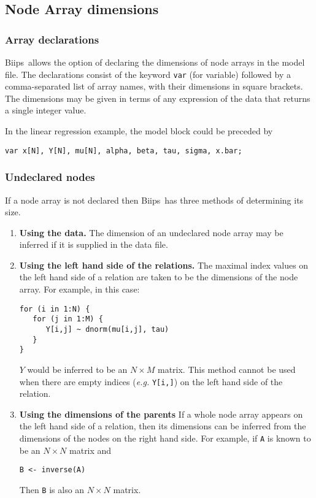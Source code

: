 \documentclass[11pt, a4paper, titlepage]{report}
\newcommand{\biips}{\textsf{Biips}}
\begin{document}
\subsection{Node Array dimensions}

\subsubsection*{Array declarations}

\biips\ allows the option of declaring the dimensions of node arrays in
the model file. The declarations consist of the keyword \texttt{var}
(for variable) followed by a comma-separated list of array names, with
their dimensions in square brackets. The dimensions may be given in
terms of any expression of the data that returns a single integer
value.

In the linear regression example, the model block could be preceded by
\begin{verbatim}
var x[N], Y[N], mu[N], alpha, beta, tau, sigma, x.bar;
\end{verbatim}

\subsubsection*{Undeclared nodes}

If a node array is not declared then \biips\ has three methods of
determining its size.
\begin{enumerate}
\item {\bf Using the data.}  The dimension of an undeclared node array
  may be inferred if it is supplied in the data file.
\item {\bf Using the left hand side of the relations.}  The maximal
  index values on the left hand side of a relation are taken to be the
  dimensions of the node array.  For example, in this case:
\begin{verbatim}
for (i in 1:N) {
   for (j in 1:M) {
      Y[i,j] ~ dnorm(mu[i,j], tau)
   }
}
\end{verbatim}
$Y$ would be inferred to be an $N \times M$ matrix. This method cannot 
be used when there are empty indices ({\em e.g.} \verb+Y[i,]+) on the left
hand side of the relation.
\item {\bf Using the dimensions of the parents} If a whole node array
  appears on the left hand side of a relation, then its dimensions can
  be inferred from the dimensions of the nodes on the right hand side.
  For example, if \verb+A+ is known to be an $N \times N$ matrix
  and
\begin{verbatim}
B <- inverse(A)
\end{verbatim}
Then \verb+B+ is also an $N \times N$ matrix.
\end{enumerate}
\end{document}
